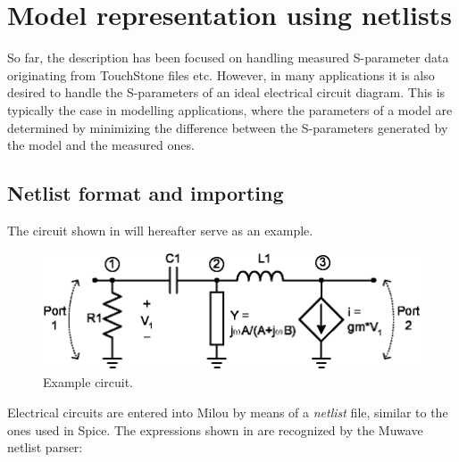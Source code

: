 %
%
\section{Model representation using netlists}\label{sec:mna}
So far, the description has been focused on handling measured
S-parameter data originating from TouchStone files etc. However,
in many applications it is also desired to handle the S-parameters
of an ideal electrical circuit diagram. This is typically the case
in modelling applications, where the parameters of a model are
determined by minimizing the difference between the S-parameters
generated by the model and the measured ones.

\subsection{Netlist format and importing}
The circuit shown in  will hereafter serve as an
example.

\begin{figure}[htbf]
    \centering
  \includegraphics[scale=0.85]{Figures/Circuit.eps}
  \caption{Example circuit.}\label{fig:Circuit}
\end{figure}

Electrical circuits are entered into Milou by means of a
\emph{netlist} file, similar to the ones used in Spice. The
expressions shown in  are recognized by the Muwave
netlist parser:

